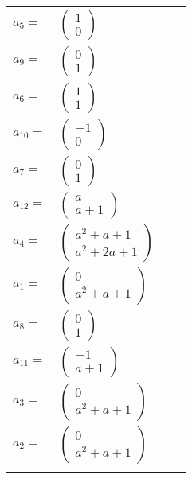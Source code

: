 \documentclass[1p]{elsarticle_modified}
\theoremstyle{definition}
\begin{document}
\begin{tabular}{m{7pt} m{180pt} m{7pt} m{180pt} }
\flushright $a_{5}=$&$\begin{pmatrix}1\\0\end{pmatrix}$ \\
\flushright $a_{9}=$&$\begin{pmatrix}0\\1\end{pmatrix}$ \\
\flushright $a_{6}=$&$\begin{pmatrix}1\\1\end{pmatrix}$ \\
\flushright $a_{10}=$&$\begin{pmatrix}-1\\0\end{pmatrix}$ \\
\flushright $a_{7}=$&$\begin{pmatrix}0\\1\end{pmatrix}$ \\
\flushright $a_{12}=$&$\begin{pmatrix}a\\a+1\end{pmatrix}$ \\
\flushright $a_{4}=$&$\begin{pmatrix}a^2+a+1\\a^2+2 a+1\end{pmatrix}$ \\
\flushright $a_{1}=$&$\begin{pmatrix}0\\a^2+a+1\end{pmatrix}$ \\
\flushright $a_{8}=$&$\begin{pmatrix}0\\1\end{pmatrix}$ \\
\flushright $a_{11}=$&$\begin{pmatrix}-1\\a+1\end{pmatrix}$ \\
\flushright $a_{3}=$&$\begin{pmatrix}0\\a^2+a+1\end{pmatrix}$ \\
\flushright $a_{2}=$&$\begin{pmatrix}0\\a^2+a+1\end{pmatrix}$\\&\end{tabular}
\end{document}
